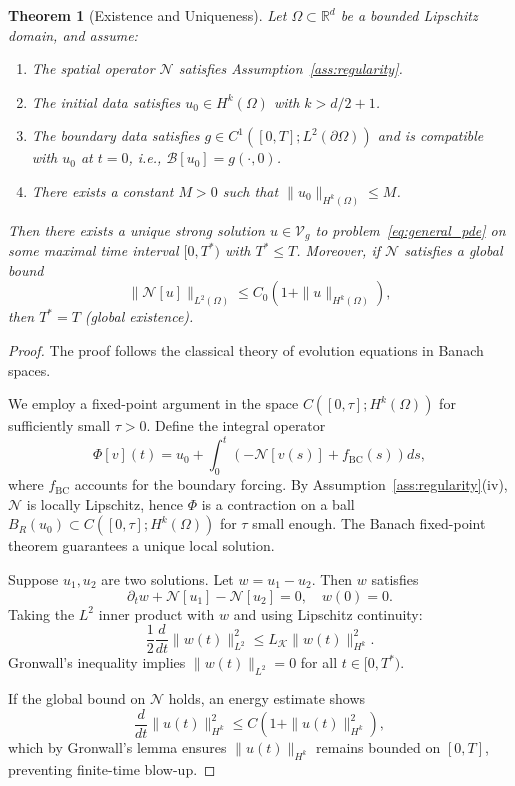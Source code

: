\documentclass[11pt,reqno]{amsart}
\theoremstyle{plain}
\newtheorem{theorem}{Theorem}[section]
\theoremstyle{definition}
\theoremstyle{remark}
\begin{document}
\begin{theorem}[Existence and Uniqueness]\label{thm:existence_uniqueness}
Let $\Omega \subset \mathbb{R}^d$ be a bounded Lipschitz domain, and assume:
\begin{enumerate}[label=(\alph*)]
    \item The spatial operator $\mathcal{N}$ satisfies Assumption~\ref{ass:regularity}.
    \item The initial data satisfies $u_0 \in H^k(\Omega)$ with $k > d/2 + 1$.
    \item The boundary data satisfies $g \in C^1([0,T]; L^2(\partial\Omega))$ and is compatible with $u_0$ at $t=0$, i.e., $\mathcal{B}[u_0] = g(\cdot, 0)$.
    \item There exists a constant $M > 0$ such that $\|u_0\|_{H^k(\Omega)} \leq M$.
\end{enumerate}
Then there exists a unique strong solution $u \in \mathcal{V}_g$ to problem~\eqref{eq:general_pde} on some maximal time interval $[0, T^*)$ with $T^* \leq T$. Moreover, if $\mathcal{N}$ satisfies a global bound
\[
\|\mathcal{N}[u]\|_{L^2(\Omega)} \leq C_0(1 + \|u\|_{H^k(\Omega)}),
\]
then $T^* = T$ (global existence).
\end{theorem}

\begin{proof}[Proof]
The proof follows the classical theory of evolution equations in Banach spaces.

We employ a fixed-point argument in the space $C([0,\tau]; H^k(\Omega))$ for sufficiently small $\tau > 0$. Define the integral operator
\[
\Phi[v](t) = u_0 + \int_0^t \left( -\mathcal{N}[v(s)] + f_{\text{BC}}(s) \right) ds,
\]
where $f_{\text{BC}}$ accounts for the boundary forcing. By Assumption~\ref{ass:regularity}(iv), $\mathcal{N}$ is locally Lipschitz, hence $\Phi$ is a contraction on a ball $B_R(u_0) \subset C([0,\tau]; H^k(\Omega))$ for $\tau$ small enough. The Banach fixed-point theorem guarantees a unique local solution.

Suppose $u_1, u_2$ are two solutions. Let $w = u_1 - u_2$. Then $w$ satisfies
\[
\partial_t w + \mathcal{N}[u_1] - \mathcal{N}[u_2] = 0, \quad w(0) = 0.
\]
Taking the $L^2$ inner product with $w$ and using Lipschitz continuity:
\[
\frac{1}{2}\frac{d}{dt}\|w(t)\|_{L^2}^2 \leq L_{\mathcal{K}} \|w(t)\|_{H^k}^2.
\]
Gronwall's inequality implies $\|w(t)\|_{L^2} = 0$ for all $t \in [0,T^*)$.

If the global bound on $\mathcal{N}$ holds, an energy estimate shows
\[
\frac{d}{dt}\|u(t)\|_{H^k}^2 \leq C(1 + \|u(t)\|_{H^k}^2),
\]
which by Gronwall's lemma ensures $\|u(t)\|_{H^k}$ remains bounded on $[0,T]$, preventing finite-time blow-up.
\end{proof}
\end{document}
